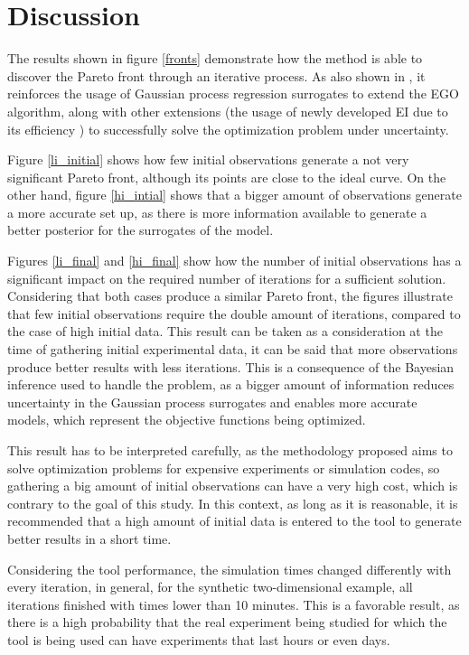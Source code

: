 \documentclass{article}
\begin{document}
\section{Discussion}

The results shown in figure \ref{fronts} demonstrate how the method is able to discover the Pareto front through an iterative process. As also shown in \cite{Huang2006}, it reinforces the usage of Gaussian process regression surrogates to extend the EGO algorithm, along with other extensions (the usage of newly developed EI due to its efficiency \cite{Jones1998}) to successfully solve the optimization problem under uncertainty.

Figure \ref{li_initial} shows how few initial observations generate a not very significant Pareto front, although its points are close to the ideal curve. On the other hand, figure \ref{hi_intial} shows that a bigger amount of observations generate a more accurate set up, as there is more information available to generate a better posterior for the surrogates of the model.

Figures \ref{li_final} and \ref{hi_final} show how the number of initial observations has a significant impact on the required number of iterations for a sufficient solution. Considering that both cases produce a similar Pareto front, the figures illustrate that few initial observations require the double amount of iterations, compared to the case of high initial data. This result can be taken as a consideration at the time of gathering initial experimental data, it can be said that more observations produce better results with less iterations. This is a consequence of the Bayesian inference used to handle the problem, as a bigger amount of information reduces uncertainty in the Gaussian process surrogates and enables more accurate models, which represent the objective functions being optimized.

This result has to be interpreted carefully, as the methodology proposed aims to solve optimization problems for expensive experiments or simulation codes, so gathering a big amount of initial observations can have a very high cost, which is contrary to the goal of this study. In this context, as long as it is reasonable, it is recommended that a high amount of initial data is entered to the tool to generate better results in a short time.

Considering the tool performance, the simulation times changed differently with every iteration, in general, for the synthetic two-dimensional example, all iterations finished with times lower than 10 minutes. This is a favorable result, as there is a high probability that the real experiment being studied for which the tool is being used can have experiments that last hours or even days.
\end{document}
